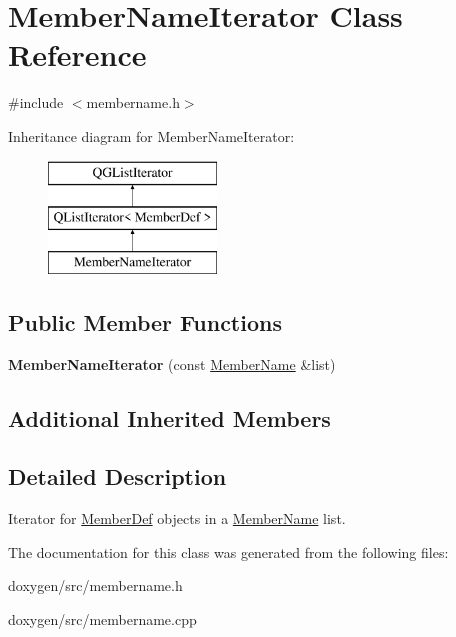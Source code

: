 \hypertarget{class_member_name_iterator}{}\section{Member\+Name\+Iterator Class Reference}
\label{class_member_name_iterator}


{\ttfamily \#include $<$membername.\+h$>$}

Inheritance diagram for Member\+Name\+Iterator\+:\begin{figure}[H]
\begin{center}
\leavevmode
\includegraphics[height=3.000000cm]{class_member_name_iterator}
\end{center}
\end{figure}
\subsection*{Public Member Functions}
\begin{DoxyCompactItemize}
\item 
\mbox{\label{class_member_name_iterator_a1cfd755d031c816ce08217b0e15d68f8}} 
{\bfseries Member\+Name\+Iterator} (const \mbox{\hyperlink{class_member_name}{Member\+Name}} \&list)
\end{DoxyCompactItemize}
\subsection*{Additional Inherited Members}


\subsection{Detailed Description}
Iterator for \mbox{\hyperlink{class_member_def}{Member\+Def}} objects in a \mbox{\hyperlink{class_member_name}{Member\+Name}} list. 

The documentation for this class was generated from the following files\+:\begin{DoxyCompactItemize}
\item 
doxygen/src/membername.\+h\item 
doxygen/src/membername.\+cpp\end{DoxyCompactItemize}
